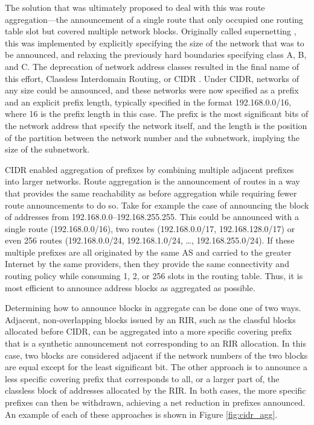 %

The solution that was ultimately proposed to deal with this was route aggregation---the announcement of a single route that only occupied one routing table slot but covered multiple network blocks. Originally called supernetting \cite{rfc1338}, this was implemented by explicitly specifying the size of the network that was to be announced, and relaxing the previously hard boundaries specifying class A, B, and C. The deprecation of network address classes resulted in the final name of this effort, Classless Interdomain Routing, or CIDR \cite{rfc1519}. Under CIDR, networks of any size could be announced, and these networks were now specified as a prefix and an explicit prefix length, typically specified in the format 192.168.0.0/16, where 16 is the prefix length in this case. The prefix is the most significant bits of the network address that specify the network itself, and the length is the position of the partition between the network number and the subnetwork, implying the size of the subnetwork.

CIDR enabled aggregation of prefixes by combining multiple adjacent prefixes into larger networks. Route aggregation is the announcement of routes in a way that provides the same reachability as before aggregation while requiring fewer route announcements to do so. Take for example the case of announcing the block of addresses from 192.168.0.0--192.168.255.255. This could be announced with a single route (192.168.0.0/16), two routes (192.168.0.0/17, 192.168.128.0/17) or even 256 routes (192.168.0.0/24, 192.168.1.0/24, \ldots, 192.168.255.0/24). If these multiple prefixes are all originated by the same AS and carried to the greater Internet by the same providers, then they provide the same connectivity and routing policy while consuming 1, 2, or 256 slots in the routing table. Thus, it is most efficient to announce address blocks as aggregated as possible.

Determining how to announce blocks in aggregate can be done one of two ways. Adjacent, non-overlapping blocks issued by an RIR, such as the classful blocks allocated before CIDR, can be aggregated into a more specific covering prefix that is a synthetic announcement not corresponding to an RIR allocation. In this case, two blocks are considered adjacent if the network numbers of the two blocks are equal except for the least significant bit. The other approach is to announce a less specific covering prefix that corresponds to all, or a larger part of, the classless block of addresses allocated by the RIR. In both cases, the more specific prefixes can then be withdrawn, achieving a net reduction in prefixes announced. An example of each of these approaches is shown in Figure \ref{fig:cidr_agg}.

